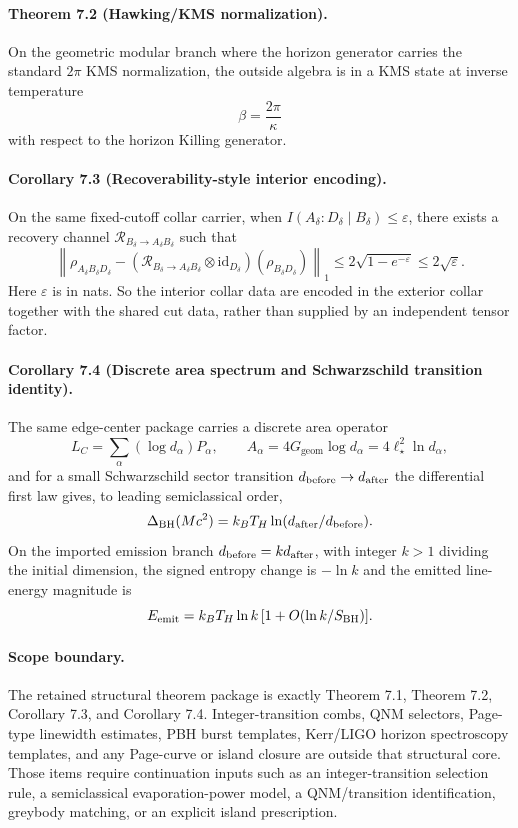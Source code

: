 \paragraph{\textbf{Theorem 7.2 (Hawking/KMS normalization).}}
On the geometric modular branch where the horizon generator carries the standard \(2\pi\) KMS
normalization, the outside algebra is in a KMS state at inverse temperature
\[
\beta=\frac{2\pi}{\kappa}
\]
with respect to the horizon Killing generator.

\paragraph{\textbf{Corollary 7.3 (Recoverability-style interior encoding).}}
On the same fixed-cutoff collar carrier, when
\(I(A_\delta:D_\delta\mid B_\delta)\le\varepsilon\), there exists a recovery channel
\(\mathcal R_{B_\delta\to A_\delta B_\delta}\) such that
\[
\left\|
\rho_{A_\delta B_\delta D_\delta}
-
(\mathcal R_{B_\delta\to A_\delta B_\delta}\otimes \mathrm{id}_{D_\delta})(\rho_{B_\delta D_\delta})
\right\|_1
\le
2\sqrt{1-e^{-\varepsilon}}
\le2\sqrt{\varepsilon}.
\]
Here \(\varepsilon\) is in nats.
So the interior collar data are encoded in the exterior collar together with the shared cut data,
rather than supplied by an independent tensor factor.

\paragraph{\textbf{Corollary 7.4 (Discrete area spectrum and Schwarzschild transition identity).}}
The same edge-center package carries a discrete area operator
\[
L_C=\sum_\alpha (\log d_\alpha)P_\alpha,
\qquad
A_\alpha=4G_{\mathrm{geom}}\log d_\alpha=4\ell_\star^2\ln d_\alpha,
\]
and for a small Schwarzschild sector transition \(d_{\rm before}\to
d_{\rm after}\) the differential first law gives, to leading semiclassical
order,
\[
\Delta_{\rm BH}(Mc^2)=k_B T_H
\ln(d_{\rm after}/d_{\rm before}).
\]
On the imported emission branch
\(d_{\rm before}=k d_{\rm after}\), with integer \(k>1\) dividing the initial
dimension, the signed entropy change is \(-\ln k\) and the emitted line-energy
magnitude is
\[
E_{\mathrm{emit}}=k_B T_H\ln k
\,[1+O(\ln k/S_{\rm BH})].
\]

\paragraph{\textbf{Scope boundary.}}
The retained structural theorem package is exactly Theorem 7.1, Theorem 7.2, Corollary 7.3, and
Corollary 7.4. Integer-transition combs, QNM selectors, Page-type linewidth estimates, PBH burst
templates, Kerr/LIGO horizon spectroscopy templates, and any Page-curve or island closure are
outside that structural core. Those items require continuation inputs such as an integer-transition
selection rule, a semiclassical evaporation-power model, a QNM/transition identification, greybody
matching, or an explicit island prescription.

